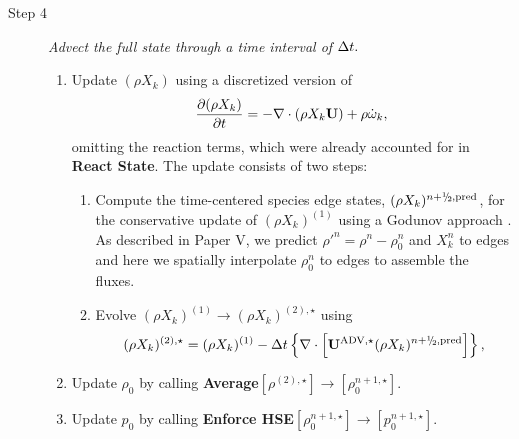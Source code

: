 \begin{description}
\item[Step 4] {\em Advect the full state through a time interval of $\Delta t.$}

\begin{enumerate}
\renewcommand{\theenumi}{{\bf \Alph{enumi}}}

\item Update $(\rho X_k)$ using a discretized version of
%
\begin{equation}
\frac{\partial(\rho X_k)}{\partial t} = -\nabla\cdot(\rho X_k\Ub) + \rho\omegadot_k,
\end{equation}
%
omitting the reaction terms, which were already
accounted for in {\bf React State}.  The update consists of two steps:

\begin{enumerate}
\renewcommand{\labelenumii}{{\bf \roman{enumii}}.}

\item Compute the time-centered species edge states, $(\rho X_k)^{\nph,\pred}$,
  for the conservative update of $(\rho X_k)^{(1)}$ using a Godunov approach \citep{XRB_III}.
  As described in Paper V, we predict $\rho'^n=\rho^n-\rho_0^n$ and $X_k^n$ to edges
  and here we spatially interpolate $\rho_0^n$ to edges to assemble the fluxes.

\item Evolve $(\rho X_k)^{(1)} \rightarrow (\rho X_k)^{(2),\star}$ using
\begin{equation}
(\rho X_k)^{(2),\star} = (\rho X_k)^{(1)}
  - \dt \left\{ \nabla \cdot \left[ \uadvone (\rho X_k)^{\nph,\pred} \right] \right\},
\end{equation}

\end{enumerate}

\item Update $\rho_0$ by calling {\bf Average}$[\rho^{(2),\star}]\rightarrow[\rho_0^{n+1,\star}]$.

\item Update $p_0$ by calling {\bf Enforce HSE}$[\rho_0^{n+1,\star}] \rightarrow [p_0^{n+1,\star}]$.


\end{enumerate}
\end{description}
